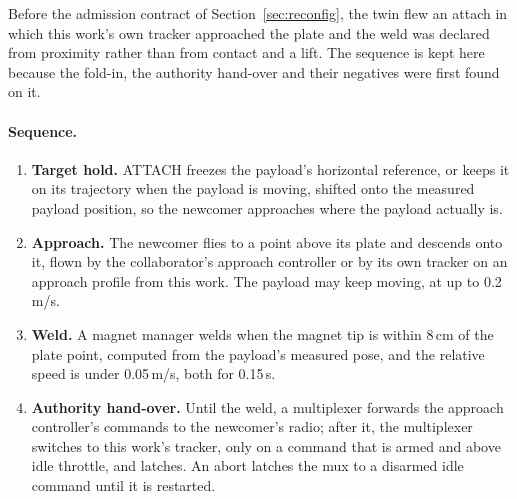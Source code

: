 Before the admission contract of Section~\ref{sec:reconfig}, the twin flew an attach in which this work's own
tracker approached the plate and the weld was declared from proximity rather than from contact and a lift. The
sequence is kept here because the fold-in, the authority hand-over and their negatives were first found on it.

\paragraph{Sequence.}
\begin{enumerate}
    \item \textbf{Target hold.} ATTACH freezes the payload's horizontal reference, or keeps it on its
    trajectory when the payload is moving, shifted onto the measured payload position, so the newcomer
    approaches where the payload actually is.
    \item \textbf{Approach.} The newcomer flies to a point above its plate and descends onto it, flown by
    the collaborator's approach controller or by its own tracker on an approach profile from this work.
    The payload may keep moving, at up to 0.2\,m/s.
    \item \textbf{Weld.} A magnet manager welds when the magnet tip is within 8\,cm of the plate point,
    computed from the payload's measured pose, and the relative speed is under 0.05\,m/s, both for 0.15\,s.
    \item \textbf{Authority hand-over.} Until the weld, a multiplexer forwards the approach controller's
    commands to the newcomer's radio; after it, the multiplexer switches to this work's tracker, only on a
    command that is armed and above idle throttle, and latches. An abort latches the mux to a disarmed idle
    command until it is restarted.

\end{enumerate}
